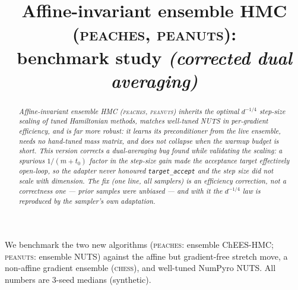 \documentclass[11pt]{article}
\title{Affine-invariant ensemble HMC (\textsc{peaches}, \textsc{peanuts}):\\
       benchmark study \emph{(corrected dual averaging)}}
\author{}
\date{}
\begin{document}
\maketitle

\begin{abstract}\noindent
\emph{Affine-invariant ensemble HMC (\textsc{peaches}, \textsc{peanuts})
inherits the optimal $d^{-1/4}$ step-size scaling of tuned Hamiltonian
methods, matches well-tuned NUTS in per-gradient efficiency, and is far more
robust: it learns its preconditioner from the live ensemble, needs no
hand-tuned mass matrix, and does not collapse when the warmup budget is short.
This version corrects a dual-averaging bug found while validating the scaling:
a spurious $1/(m{+}t_0)$ factor in the step-size gain made the acceptance
target effectively open-loop, so the adapter never honoured \texttt{target\_accept}
and the step size did not scale with dimension. The fix (one line, all
samplers) is an \emph{efficiency} correction, not a correctness one --- prior
samples were unbiased --- and with it the $d^{-1/4}$ law is reproduced by the
sampler's own adaptation.}
\end{abstract}

We benchmark the two new algorithms (\textsc{peaches}: ensemble ChEES-HMC;
\textsc{peanuts}: ensemble NUTS) against the affine but gradient-free stretch
move, a non-affine gradient ensemble (\textsc{chess}), and well-tuned NumPyro
NUTS. All numbers are 3-seed medians (synthetic).
\end{document}
